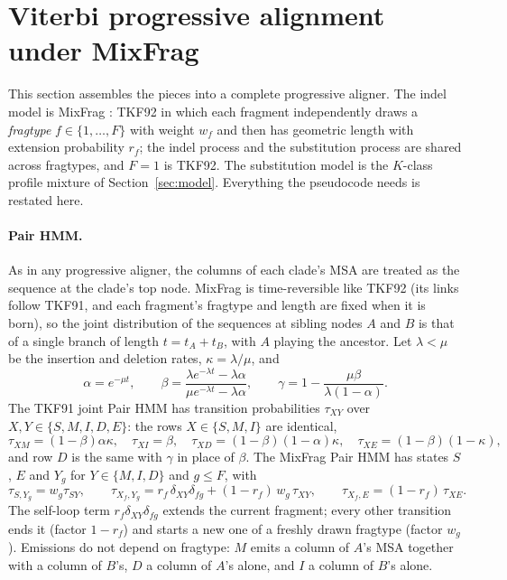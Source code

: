 \documentclass[11pt]{article}
\begin{document}
\section{Viterbi progressive alignment under MixFrag}
\label{sec:viterbi}

This section assembles the pieces into a complete progressive aligner. The
indel model is MixFrag \citep{HolmesMixFrag}: TKF92 in which each fragment
independently draws a \emph{fragtype} $f\in\{1,\dots,F\}$ with weight $w_f$ and
then has geometric length with extension probability $r_f$; the indel process
and the substitution process are shared across fragtypes, and $F=1$ is TKF92.
The substitution model is the $K$-class profile mixture of
Section~\ref{sec:model}. Everything the pseudocode needs is restated here.

\paragraph{Pair HMM.} As in any progressive aligner, the columns of each
clade's MSA are treated as the sequence at the clade's top node. MixFrag is
time-reversible like TKF92 (its links follow TKF91, and each fragment's
fragtype and length are fixed when it is born), so the joint distribution of the
sequences at sibling nodes $A$ and $B$ is that of a single branch of length
$t=t_A+t_B$, with $A$ playing the ancestor. Let $\lambda<\mu$ be the insertion
and deletion rates, $\kappa=\lambda/\mu$, and
\[
\alpha=e^{-\mu t},\qquad
\beta=\frac{\lambda e^{-\lambda t}-\lambda\alpha}{\mu e^{-\lambda t}-\lambda\alpha},\qquad
\gamma=1-\frac{\mu\beta}{\lambda(1-\alpha)}.
\]
The TKF91 joint Pair HMM has transition probabilities $\tau_{XY}$ over
$X,Y\in\{S,M,I,D,E\}$: the rows $X\in\{S,M,I\}$ are identical,
\[
\tau_{XM}=(1-\beta)\alpha\kappa,\quad
\tau_{XI}=\beta,\quad
\tau_{XD}=(1-\beta)(1-\alpha)\kappa,\quad
\tau_{XE}=(1-\beta)(1-\kappa),
\]
and row $D$ is the same with $\gamma$ in place of $\beta$. The MixFrag Pair HMM
has states $S$, $E$ and $Y_g$ for $Y\in\{M,I,D\}$ and $g\le F$, with
\[
\tau_{S,Y_g}=w_g\tau_{SY},\qquad
\tau_{X_f,Y_g}=r_f\,\delta_{XY}\delta_{fg}+(1-r_f)\,w_g\,\tau_{XY},\qquad
\tau_{X_f,E}=(1-r_f)\,\tau_{XE}.
\]
The self-loop term $r_f\delta_{XY}\delta_{fg}$ extends the current fragment;
every other transition ends it (factor $1-r_f$) and starts a new one of a
freshly drawn fragtype (factor $w_g$). Emissions do not depend on fragtype:
$M$ emits a column of $A$'s MSA together with a column of $B$'s, $D$ a column
of $A$'s alone, and $I$ a column of $B$'s alone.
\end{document}
